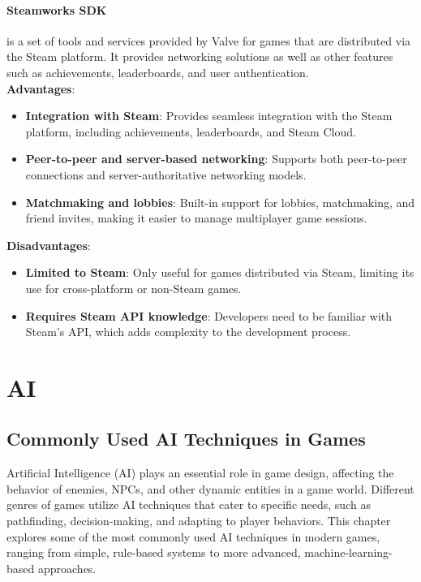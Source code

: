 \documentclass{article} %
\begin{document}
\paragraph{Steamworks SDK} is a set of tools and services provided by Valve for games that are distributed via the Steam platform. It provides networking solutions as well as other features such as achievements, leaderboards, and user authentication.
\\
\textbf{Advantages}:
\begin{itemize}
	\item \textbf{Integration with Steam}: Provides seamless integration with the Steam platform, including achievements, leaderboards, and Steam Cloud.
	\item \textbf{Peer-to-peer and server-based networking}: Supports both peer-to-peer connections and server-authoritative networking models.
	\item \textbf{Matchmaking and lobbies}: Built-in support for lobbies, matchmaking, and friend invites, making it easier to manage multiplayer game sessions.
\end{itemize}

\textbf{Disadvantages}:
\begin{itemize}
	\item \textbf{Limited to Steam}: Only useful for games distributed via Steam, limiting its use for cross-platform or non-Steam games.
	\item \textbf{Requires Steam API knowledge}: Developers need to be familiar with Steam's API, which adds complexity to the development process.
\end{itemize}

\newpage

\section{AI}
\subsection{Commonly Used AI Techniques in Games}

Artificial Intelligence (AI) plays an essential role in game design, affecting the behavior of enemies, NPCs, and other dynamic entities in a game world. Different genres of games utilize AI techniques that cater to specific needs, such as pathfinding, decision-making, and adapting to player behaviors. This chapter explores some of the most commonly used AI techniques in modern games, ranging from simple, rule-based systems to more advanced, machine-learning-based approaches.
\end{document}

